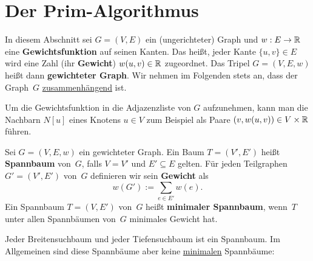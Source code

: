 
\section{Der Prim-Algorithmus}


\begin{bem}
In diesem Abschnitt sei $G=(V,E)$ ein (ungerichteter) Graph und $w : E \to \mathbb{R}$ eine \textbf{Gewichtsfunktion} auf seinen Kanten.
Das hei\ss t, jeder Kante $\{u,v\} \in E$ wird eine Zahl (ihr \textbf{Gewicht}) $w(u,v) \in \mathbb{R}$ zugeordnet.
Das Tripel $G=(V,E,w)$ hei\ss t dann \textbf{gewichteter Graph}.
Wir nehmen im Folgenden stets an, dass der Graph~$G$ \underline{zusammenhängend} ist.

Um die Gewichtsfunktion in die Adjazenzliste von $G$ aufzunehmen, kann man die Nachbarn $N[u]$ eines Knotens $u \in V$ zum Beispiel als Paare $(v,w(u,v)) \in V \times \mathbb{R}$ führen.
\end{bem}

\begin{defn}
Sei $G=(V,E,w)$ ein gewichteter Graph.
Ein Baum $T=(V',E')$ heißt \textbf{Spannbaum} von~$G$, falls $V=V'$ und $E' \subseteq E$ gelten.
Für jeden Teilgraphen $G' = (V',E')$ von~$G$ definieren wir sein \textbf{Gewicht} als
\[
w(G') := \sum_{e \in E'} w(e).
\]
%
Ein Spannbaum $T=(V,E')$ von~$G$ heißt \textbf{minimaler Spannbaum}, wenn~$T$ unter allen Spannbäumen von~$G$ minimales Gewicht hat.
\end{defn} 


\begin{bsp}
Jeder Breitensuchbaum und jeder Tiefensuchbaum ist ein Spannbaum.
Im Allgemeinen sind diese Spannbäume aber keine \underline{minimalen} Spannbäume:\\[1em]

\hfill
{}
\hfill\,


\end{bsp}

